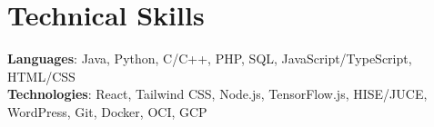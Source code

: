 \documentclass[letterpaper,11pt]{article}
\begin{document}
%
\section{Technical Skills}
 \begin{itemize}[leftmargin=0.15in, label={}]
    \small{\item{
     \textbf{Languages}{: Java, Python, C/C++, PHP, SQL, JavaScript/TypeScript, HTML/CSS} \\
     \textbf{Technologies}{: React, Tailwind CSS, Node.js, TensorFlow.js, HISE/JUCE, WordPress, Git, Docker, OCI, GCP}
    }}
 \end{itemize}


\end{document}
